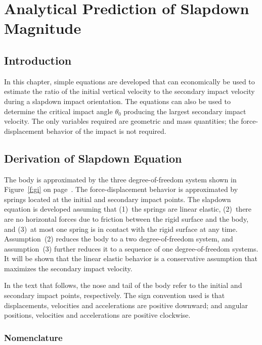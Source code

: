 \chapter{Analytical Prediction of Slapdown Magnitude}
\section{Introduction}

In this chapter, simple equations are developed that can economically
be used to estimate the ratio of the initial vertical velocity to the
secondary impact velocity during a slapdown impact orientation.  The
equations can also be used to determine the critical impact angle
$\theta_0$ producing the largest secondary impact velocity. The only
variables required are geometric and mass quantities; the
force-displacement behavior of the impact is not required.


\section{Derivation of Slapdown Equation}

The body is approximated by the three degree-of-freedom system shown
in Figure~\ref{f:gi} on page~\pageref{f:gi}.  The force-displacement
behavior is approximated by springs located at the initial and
secondary impact points. The slapdown equation is developed assuming
that (1)~the springs are linear elastic, (2)~there are no horizontal
forces due to friction between the rigid surface and the body, and
(3)~at most one spring is in contact with the rigid surface at any
time.  Assumption~(2) reduces the body to a two degree-of-freedom
system, and assumption~(3) further reduces it to a sequence of one
degree-of-freedom systems. It will be shown that the linear elastic
behavior is a conservative assumption that maximizes the secondary
impact velocity.

In the text that follows, the nose and tail of the body refer to
the initial and secondary impact points, respectively.  The sign
convention used is that displacements, velocities and accelerations are
positive downward; and angular positions, velocities and accelerations
are positive clockwise.

\subsection{Nomenclature}

